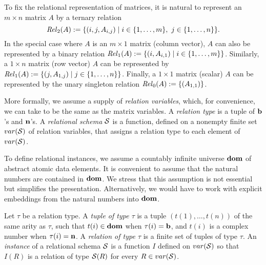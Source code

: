 To fix the relational representation of matrices, it is natural to represent an $m \times n$ matrix $A$
by a ternary relation $$
\mathit{Rel}_2(A) := \{(i,j,A_{i,j}) \mid i \in \{1,\dots,m\}, \ j \in
\{1,\dots,n\}\}. $$  In the special case where $A$ is an
$m \times 1$ matrix (column
vector), $A$ can also be represented by a binary relation
$\mathit{Rel}_1(A) :=
\{(i,A_{i,1}) \mid i \in \{1,\dots,m\}\}$.  Similarly, a $1
\times n$ matrix (row vector) $A$ can be represented by $\mathit{Rel}_1(A)
:= \{(j,A_{1,j}) \mid j \in \{1,\dots,n\}\}$.  Finally, a $1
\times 1$ matrix (scalar) $A$ can be represented by the unary
singleton relation $\mathit{Rel}_0(A) := \{(A_{1,1})\}$. 

More formally,
we assume a supply of \emph{relation variables}, which, for
convenience, we can take to be the same as the matrix variables.
A \emph{relation type} is a tuple of $\mathbf{b}$'s and $\mathbf{n}$'s.
A \emph{relational schema} $\mathcal{S}$ is a function, defined on a
nonempty finite set
$var(\mathcal{S})$ of relation variables, that assigns a relation type
to each element of $var(\mathcal{S})$.

To define relational instances, we assume a countably infinite universe
$\mathbf{dom}$ of abstract atomic data elements.  It is convenient to
assume that the natural numbers are contained in $\mathbf{dom}$.  We
stress that this assumption is not essential but simplifies the
presentation.  Alternatively, we would have to work with explicit
embeddings from the natural numbers into $\mathbf{dom}$.

Let $\tau$ be a relation type. A \emph{tuple
of type $\tau$} is a tuple $(t(1),\dots,t(n))$ of the same arity
as $\tau$, such that $t(i) \in \mathbf{dom}$ when $\tau(i) = \mathbf{b}$, and
$t(i)$ is a complex number when $\tau(i) = \mathbf{n}$.
A \emph{relation of type
$\tau$} is a finite set of tuples of type $\tau$.  
An \emph{instance} of a relational schema $\mathcal{S}$ is a
function $I$ defined on $var(\mathcal{S})$ so that $I(R)$ is a relation
of type $\mathcal{S}(R)$ for every $R \in var(\mathcal{S})$.

